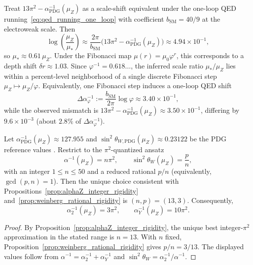 \begin{remark}\label{rem:ew_scale_shift}
Treat $13\pi^2-\alpha^{-1}_{\mathrm{PDG}}(\mu_Z)$ as a scale-shift equivalent under the one-loop QED running~\eqref{eq:qed_running_one_loop} with coefficient $b_{\mathrm{SM}}=40/9$ at the electroweak scale. Then
\begin{equation}
\log\!\left(\frac{\mu_Z}{\mu_\ast}\right)\approx \frac{2\pi}{b_{\mathrm{SM}}}\big(13\pi^2-\alpha^{-1}_{\mathrm{PDG}}(\mu_Z)\big)\approx 4.94\times 10^{-1},
\end{equation}
so $\mu_\ast\approx 0.61\,\mu_Z$. Under the Fibonacci map $\mu(r)=\mu_0\varphi^r$, this corresponds to a depth shift $\delta r\approx 1.03$. Since $\varphi^{-1}=0.618\ldots$, the inferred scale ratio $\mu_\ast/\mu_Z$ lies within a percent-level neighborhood of a single discrete Fibonacci step $\mu_Z\mapsto \mu_Z/\varphi$.
\!
Equivalently, one Fibonacci step induces a one-loop QED shift
\[
\Delta\alpha^{-1}_{\varphi}:=\frac{b_{\mathrm{SM}}}{2\pi}\log\varphi\approx 3.40\times 10^{-1},
\]
while the observed mismatch is $13\pi^2-\alpha^{-1}_{\mathrm{PDG}}(\mu_Z)\approx 3.50\times 10^{-1}$, differing by $9.6\times 10^{-3}$ (about $2.8\%$ of $\Delta\alpha^{-1}_{\varphi}$).
\end{remark}

\begin{proposition}\label{prop:ew_integer_rigidity}
Let $\alpha^{-1}_{\mathrm{PDG}}(\mu_Z)\approx 127.955$ and $\sin^2\theta_{W,\mathrm{PDG}}(\mu_Z)\approx 0.23122$ be the PDG reference values \cite{PDGRPP2024}. Restrict to the $\pi^2$-quantized ansatz
\[
\alpha^{-1}(\mu_Z)=n\pi^2,\qquad \sin^2\theta_W(\mu_Z)=\frac{p}{n},
\]
with an integer $1\le n\le 50$ and a reduced rational $p/n$ (equivalently, $\gcd(p,n)=1$). Then the unique choice consistent with Propositions~\ref{prop:alphaZ_integer_rigidity} and~\ref{prop:weinberg_rational_rigidity} is $(n,p)=(13,3)$. Consequently,
\[
\alpha_2^{-1}(\mu_Z)=3\pi^2,\qquad \alpha_Y^{-1}(\mu_Z)=10\pi^2.
\]
\end{proposition}
\begin{proof}
By Proposition~\ref{prop:alphaZ_integer_rigidity}, the unique best integer-$\pi^2$ approximation in the stated range is $n=13$. With $n$ fixed, Proposition~\ref{prop:weinberg_rational_rigidity} gives $p/n=3/13$. The displayed values follow from $\alpha^{-1}=\alpha_2^{-1}+\alpha_Y^{-1}$ and $\sin^2\theta_W=\alpha_2^{-1}/\alpha^{-1}$.
\end{proof}

